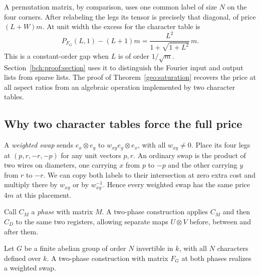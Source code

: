 A permutation matrix, by comparison, uses one common label of size $N$
on the four corners. After relabeling the legs its tensor is precisely
that diagonal, of price $(L+W)m$. At unit width the excess for the
character table is
\[
 P_{F_G}(L,1)-(L+1)m
       = \frac{L^2}{1+\sqrt{1+L^2}}\,m .
\]
This is a constant-order gap when $L$ is of order $1/\sqrt m$.
Section~\ref{bch:proof:section} uses it to distinguish the Fourier
input and output lists from sparse lists. The proof of
Theorem~\ref{geo:saturation} recovers the price at all aspect ratios
from an algebraic operation implemented by two character tables.

\subsection{Why two character tables force the full price}

A \emph{weighted swap} sends $e_x\otimes e_y$ to
$w_{xy}e_y\otimes e_x$, with all $w_{xy}\ne0$. Place its four legs
at $(p,r,-r,-p)$ for any unit vectors $p,r$. An ordinary swap is
the product of two wires on diameters, one carrying $x$ from $p$ to
$-p$ and the other carrying $y$ from $r$ to $-r$. We can copy both
labels to their intersection at zero extra cost and multiply there by
$w_{xy}$ or by $w_{xy}^{-1}$. Hence every weighted swap has the same
price $4m$ at this placement.

Call $C_M$ a \emph{phase} with matrix $M$. A two-phase construction
applies $C_M$ and then $C_D$ to the same two registers, allowing
separate maps $U\otimes V$ before, between and after them.

\begin{lemma}\label{geo:swap}
Let $G$ be a finite abelian group of order $N$ invertible in $k$,
with all $N$ characters defined over $k$. A two-phase construction
with matrix $F_G$ at both phases realizes a weighted swap.
\end{lemma}

